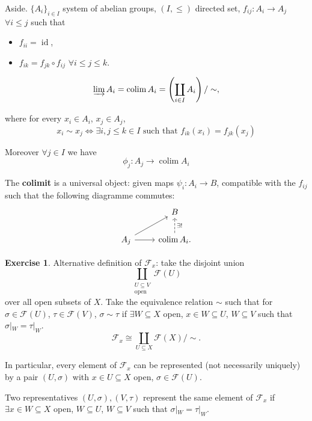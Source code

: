\documentclass[12pt]{article}
\DeclareMathOperator{\id}{id}
\DeclareMathOperator*{\colim}{colim}
\theoremstyle{definition}
\newtheorem*{exercise}{Exercise}
\begin{document}
Aside. $\{A_i\}_{i\in I}$ system of abelian groups, $(I,\leq)$ directed set, $f_{ij}:A_i\rightarrow A_j$ $\forall i\leq j$ such that
\begin{itemize}
\item $f_{ii}=\id$,
\item $f_{ik}=f_{jk}\circ f_{ij}$ $\forall i\leq j\leq k$.
\end{itemize}

\[\varinjlim A_i=\colim A_i=\left(\coprod_{i\in I}A_i\right)/\sim,\]

where for every $x_i\in A_i$, $x_j\in A_j$,
\[x_i\sim x_j\Leftrightarrow\exists i,j\leq k\in I\text{ such that }f_{ik}(x_i)=f_{jk}(x_j)\]

Moreover $\forall j\in I$ we have
\[\phi_j:A_j\longrightarrow\colim A_i\]

The \textbf{colimit} is a universal object: given maps $\psi_i:A_i\rightarrow B$, compatible with the $f_{ij}$ such that the following diagramme commutes:
\[\begin{tikzcd}&B\\A_j\arrow[ru]\arrow[r]&\colim A_i.\arrow[u,dashed,"\exists!",swap]\end{tikzcd}\]

\begin{exercise}
Alternative definition of $\mathcal F_x$: take the disjoint union
\[\coprod_{\substack{U\subseteq V\\\text{open}}}\mathcal F(U)\]
over all open subsets of $X$. Take the equivalence relation $\sim$ such that for $\sigma\in\mathcal F(U)$, $\tau\in\mathcal F(V)$, $\sigma\sim\tau$ if $\exists W\subseteq X$ open, $x\in W\subseteq U$, $W\subseteq V$ such that $\sigma|_W=\tau|_W$.
\[\mathcal F_x\cong\coprod_{U\subseteq X}\mathcal F(X)/\sim.\]

In particular, every element of $\mathcal F_x$ can be represented (not necessarily uniquely) by a pair $(U,\sigma)$ with $x\in U\subseteq X$ open, $\sigma\in\mathcal F(U)$.

Two representatives $(U,\sigma),(V,\tau)$ represent the same element of $\mathcal F_x$ if $\exists x\in W\subseteq X$ open, $W\subseteq U$, $W\subseteq V$ such that $\sigma|_W=\tau|_W$.
\end{exercise}
\end{document}
